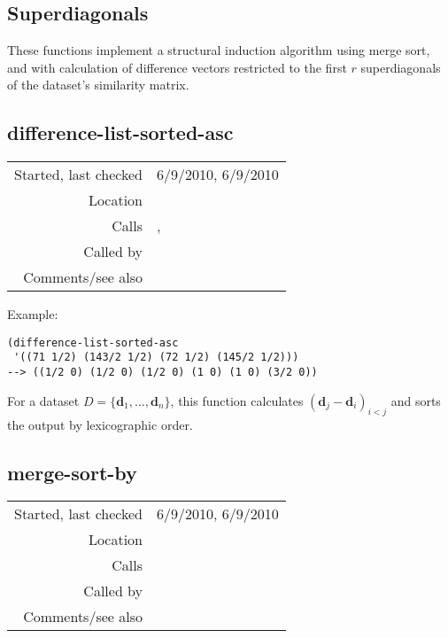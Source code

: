 \subsection{Superdiagonals}\label{sec:superdiagonals}

These functions implement a structural
induction algorithm using merge sort, and with
calculation of difference vectors restricted to the
first $r$ superdiagonals of the dataset's similarity
matrix.


\subsection*{difference-list-sorted-asc}\label{fun:difference-list-sorted-asc}

\vspace{0.3cm}
\begin{tabular}{r|p{8cm}}
Started, last checked & 6/9/2010, 6/9/2010 \\
Location & \nameref{sec:superdiagonals} \\
Calls & \nameref{fun:subtract-two-lists}, \nameref{fun:vector<vector-t-or-nil} \\
Called by & \nameref{fun:merge-sort-diff-sets-of-datapoints} \\
Comments/see also & 
\end{tabular}

\vspace{0.5cm}
\noindent Example:
\begin{verbatim}
(difference-list-sorted-asc
 '((71 1/2) (143/2 1/2) (72 1/2) (145/2 1/2)))
--> ((1/2 0) (1/2 0) (1/2 0) (1 0) (1 0) (3/2 0))
\end{verbatim}

\noindent For a dataset $D = \{\mathbf{d}_1,\ldots,
\mathbf{d}_n\}$, this function calculates
$(\mathbf{d}_j - \mathbf{d}_i)_{i < j}$ and sorts
the output by lexicographic order.


\subsection*{merge-sort-by}\label{fun:merge-sort-by}

\vspace{0.3cm}
\begin{tabular}{r|p{8cm}}
Started, last checked & 6/9/2010, 6/9/2010 \\
Location & \nameref{sec:superdiagonals} \\
Calls & \nameref{fun:vector<vector-car-cdr} \\
Called by & \nameref{fun:structure-induction-algorithm-r} \\
Comments/see also & 
\end{tabular}

